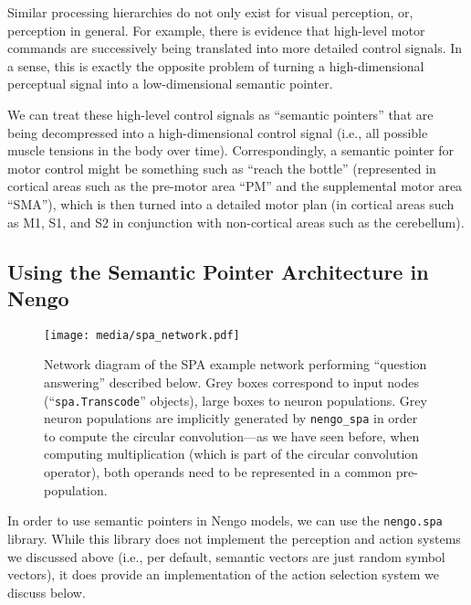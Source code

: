 \documentclass[10pt,letterpaper,oneside]{article}
\begin{document}
Similar processing hierarchies do not only exist for visual perception, or, perception in general. For example, there is evidence that high-level motor commands are successively being translated into more detailed control signals. In a sense, this is exactly the opposite problem of turning a high-dimensional perceptual signal into a low-dimensional semantic pointer. 

We can treat these high-level control signals as \enquote{semantic pointers} that are being decompressed into a high-dimensional control signal (i.e., all possible muscle tensions in the body over time). Correspondingly, a semantic pointer for motor control might be something such as \enquote{reach the bottle} (represented in cortical areas such as the pre-motor area \enquote{PM} and the supplemental motor area \enquote{SMA}), which is then turned into a detailed motor plan (in cortical areas such as M1, S1, and S2 in conjunction with non-cortical areas such as the cerebellum).


\subsection{Using the Semantic Pointer Architecture in Nengo}

\begin{figure}
	\centering
	\texttt{[image: media/spa\_network.pdf]}
	\caption{Network diagram of the SPA example network performing \enquote{question answering} described below. Grey boxes correspond to input nodes (\enquote{\texttt{spa.Transcode}} objects), large boxes to neuron populations. Grey neuron populations are implicitly generated by \texttt{nengo\_spa} in order to compute the circular convolution---as we have seen before, when computing multiplication (which is part of the circular convolution operator), both operands need to be represented in a common pre-population.}
	\label{fig:spa_network}
\end{figure}

In order to use semantic pointers in Nengo models, we can use the \texttt{nengo.spa} library. While this library does not implement the perception and action systems we discussed above (i.e., per default, semantic vectors are just random symbol vectors), it does provide an implementation of the action selection system we discuss below.
\end{document}
